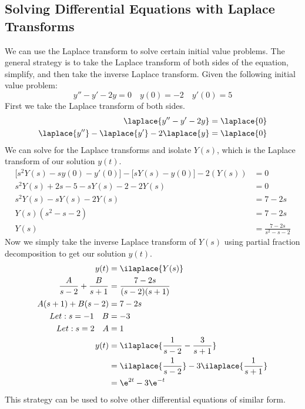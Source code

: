 \documentclass{math}
\begin{document}
\subsection*{Solving Differential Equations with Laplace Transforms}
We can use the Laplace transform to solve certain initial value problems.
The general strategy is to take the Laplace transform of both sides of the
equation, simplify, and then take the inverse Laplace transform. Given the
following initial value problem:
\[ y''-y'-2y = 0 \quad y(0) = -2 \quad y'(0) = 5 \]
First we take the Laplace transform of both sides.
\begin{align*}
  \laplace{y''-y'-2y} &= \laplace{0} \\
  \laplace{y''}-\laplace{y'}-2\laplace{y} &= \laplace{0}
\end{align*}
We can solve for the Laplace transforms and isolate \( Y(s) \), which is the
Laplace transform of our solution \( y(t) \).
\begin{align*}
  \bigg[s^2Y(s)-sy(0)-y'(0)\bigg]-\bigg[sY(s)-y(0)\bigg]-2(Y(s)) &= 0 \\
  s^2Y(s)+2s-5-sY(s)-2-2Y(s) &= 0 \\
  s^2Y(s)-sY(s)-2Y(s) &= 7-2s \\
  Y(s)(s^2-s-2) &= 7-2s \\
  Y(s) &= \frac{7-2s}{s^2-s-2}
\end{align*}
Now we simply take the inverse Laplace transform of \( Y(s) \) using partial
fraction decomposition to get our solution \( y(t) \).
\begin{align*}
  y(t) &= \ilaplace{Y(s)} \\
  \frac{A}{s-2}+\frac{B}{s+1} &= \frac{7-2s}{(s-2)(s+1)} \\
  A(s+1)+B(s-2) &= 7-2s \\
  Let: s = -1 \quad B &= -3 \\
  Let: s = 2 \quad A &= 1 \\
  y(t) &= \ilaplace{\frac{1}{s-2}-\frac{3}{s+1}} \\
  &= \ilaplace{\frac{1}{s-2}}-3\ilaplace{\frac{1}{s+1}} \\
  &= \e^{2t}-3\e^{-t}
\end{align*}
This strategy can be used to solve other differential equations of similar form.
\end{document}
